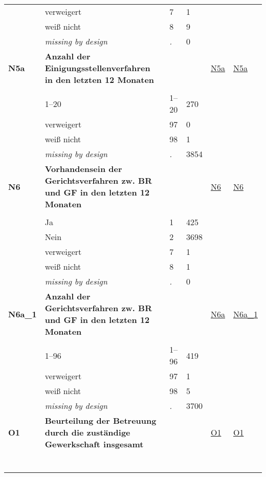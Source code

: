 \begin{longtable}{| L{2.45cm} | L{6cm} | C{1.5cm} | R{1cm} | C{2.25cm} | C{2.25cm} |}
   & verweigert & 7 & 1 &  &  \\ 
   & weiß nicht & 8 & 9 &  &  \\ 
   & \textit{missing by design} & \textit{.} & 0 &  &  \\ 
   \midrule
\textbf{N5a}\label{var:N5a} & \textbf{Anzahl der Einigungsstellenverfahren in den letzten 12 Monaten} &  &  & \hyperref[N5a]{N5a} & \hyperref[var:suf:N5a]{N5a} \\ 
   &  &  &  &  &  \\ 
   & 1--20 & 1--20 & 270 &  &  \\ 
   & verweigert & 97 & 0 &  &  \\ 
   & weiß nicht & 98 & 1 &  &  \\ 
   & \textit{missing by design} & \textit{.} & 3854 &  &  \\ 
   \midrule
\textbf{N6}\label{var:N6} & \textbf{Vorhandensein der Gerichtsverfahren zw. BR und GF in den letzten 12 Monaten} &  &  & \hyperref[N6]{N6} & \hyperref[var:suf:N6]{N6} \\ 
   &  &  &  &  &  \\ 
   & Ja & 1 & 425 &  &  \\ 
   & Nein & 2 & 3698 &  &  \\ 
   & verweigert & 7 & 1 &  &  \\ 
   & weiß nicht & 8 & 1 &  &  \\ 
   & \textit{missing by design} & \textit{.} & 0 &  &  \\ 
   \midrule
\textbf{N6a\_1}\label{var:N6a:1} & \textbf{Anzahl der Gerichtsverfahren zw. BR und GF in den letzten 12 Monaten} &  &  & \hyperref[N6a]{N6a} & \hyperref[var:suf:N6a:1]{N6a\_1} \\ 
   &  &  &  &  &  \\ 
   & 1--96 & 1--96 & 419 &  &  \\ 
   & verweigert & 97 & 1 &  &  \\ 
   & weiß nicht & 98 & 5 &  &  \\ 
   & \textit{missing by design} & \textit{.} & 3700 &  &  \\ 
   \midrule
\textbf{O1}\label{var:O1} & \textbf{Beurteilung der Betreuung durch die zuständige Gewerkschaft insgesamt} &  &  & \hyperref[O1]{O1} & \hyperref[var:suf:O1]{O1} \\ 
   & \protect\subsection[Variablen O1 bis Q7]{} &  &  &  &  \\ 

\end{longtable}
